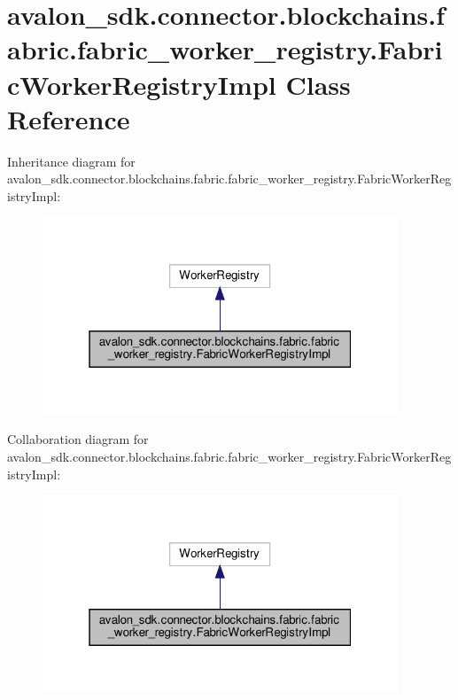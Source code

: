 \hypertarget{classavalon__sdk_1_1connector_1_1blockchains_1_1fabric_1_1fabric__worker__registry_1_1FabricWorkerRegistryImpl}{}\section{avalon\+\_\+sdk.\+connector.\+blockchains.\+fabric.\+fabric\+\_\+worker\+\_\+registry.\+Fabric\+Worker\+Registry\+Impl Class Reference}
\label{classavalon__sdk_1_1connector_1_1blockchains_1_1fabric_1_1fabric__worker__registry_1_1FabricWorkerRegistryImpl}


Inheritance diagram for avalon\+\_\+sdk.\+connector.\+blockchains.\+fabric.\+fabric\+\_\+worker\+\_\+registry.\+Fabric\+Worker\+Registry\+Impl\+:
\nopagebreak
\begin{figure}[H]
\begin{center}
\leavevmode
\includegraphics[width=301pt]{classavalon__sdk_1_1connector_1_1blockchains_1_1fabric_1_1fabric__worker__registry_1_1FabricWorkerRegistryImpl__inherit__graph}
\end{center}
\end{figure}


Collaboration diagram for avalon\+\_\+sdk.\+connector.\+blockchains.\+fabric.\+fabric\+\_\+worker\+\_\+registry.\+Fabric\+Worker\+Registry\+Impl\+:
\nopagebreak
\begin{figure}[H]
\begin{center}
\leavevmode
\includegraphics[width=301pt]{classavalon__sdk_1_1connector_1_1blockchains_1_1fabric_1_1fabric__worker__registry_1_1FabricWorkerRegistryImpl__coll__graph}
\end{center}
\end{figure}
